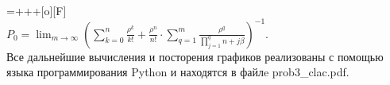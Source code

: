 \documentclass{article}
\begin{document}
\vspace{\baselineskip}
\\
\entrymodifiers={+++[o][F]}
\vspace{\baselineskip}
\\
\begin{math} P_0 = \displaystyle\lim_{m \to \infty} \left(\sum^n_{k=0} \displaystyle\frac{\rho^k}{ k!} + \displaystyle\frac{\rho^{n}}{n!} \cdot\sum^m_{q=1}\displaystyle\frac{\rho^q}{\displaystyle\prod\limits_{j = 1}^qn + j\beta} \right)^{-1}\end{math}. 
\vspace{\baselineskip}
\\
Все дальнейшие вычисления и посторения графиков реализованы с помощью языка программирования Python и находятся в файлe prob3\_clac.pdf.
\end{document}
